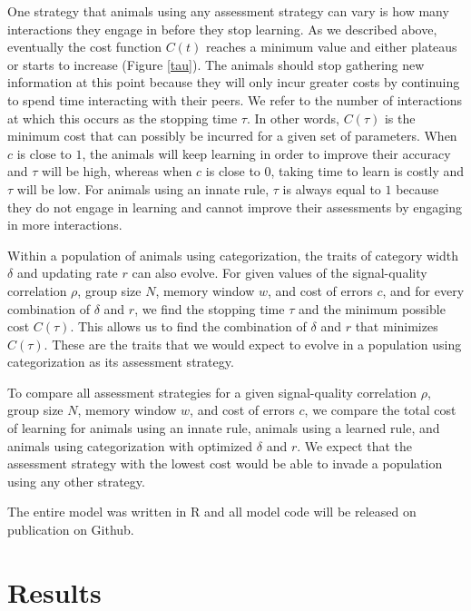 One strategy that animals using any assessment strategy can vary is how many interactions they engage in before they stop learning. As we described above, eventually the cost function $C(t)$ reaches a minimum value and either plateaus or starts to increase (Figure \ref{tau}). The animals should stop gathering new information at this point because they will only incur greater costs by continuing to spend time interacting with their peers. We refer to the number of interactions at which this occurs as the stopping time $\tau$. In other words, $C(\tau)$ is the minimum cost that can possibly be incurred for a given set of parameters. When $c$ is close to $1$, the animals will keep learning in order to improve their accuracy and $\tau$ will be high, whereas when $c$ is close to $0$, taking time to learn is costly and $\tau$ will be low. For animals using an innate rule, $\tau$ is always equal to $1$ because they do not engage in learning and cannot improve their assessments by engaging in more interactions. 

Within a population of animals using categorization, the traits of category width $\delta$ and updating rate $r$ can also evolve. For given values of the signal-quality correlation $\rho$,  group size $N$, memory window $w$, and cost of errors $c$, and for every combination of $\delta$ and $r$, we find the stopping time $\tau$ and the minimum possible cost $C(\tau)$. This allows us to find the combination of $\delta$ and $r$ that minimizes $C(\tau)$. These are the traits that we would expect to evolve in a population using categorization as its assessment strategy.  

To compare all assessment strategies for a given signal-quality correlation $\rho$, group size $N$, memory window $w$, and cost of errors $c$, we compare the total cost of learning for animals using an innate rule, animals using a learned rule, and animals using categorization with optimized $\delta$ and $r$. We expect that the assessment strategy with the lowest cost would be able to invade a population using any other strategy.

The entire model was written in R and all model code will be released on publication on Github.

\section*{Results}

